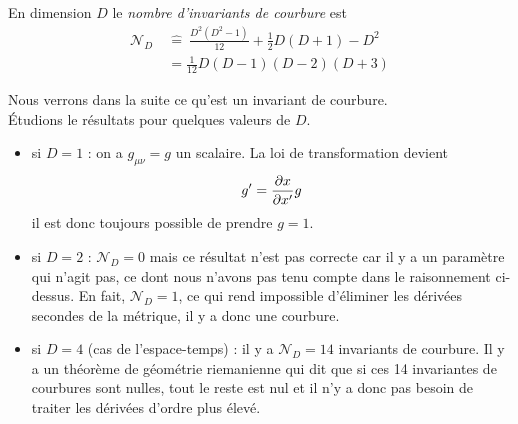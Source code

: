 \documentclass[a4paper,11pt]{report}
\begin{document}
            \begin{defn}
                En dimension $D$ le \textit{nombre d'invariants de courbure} est 
                \begin{align}
                    \mathscr{N}_D ~&\hat{=}~  \frac{D^2(D^2-1)}{12}+\frac{1}{2}D(D+1)-D^2\\
                &= \frac{1}{12}D(D-1)(D-2)(D+3)
                \end{align}
            \end{defn}
            Nous verrons dans la suite ce qu'est un invariant de courbure.\\
            Étudions le résultats pour quelques valeurs de $D$.
            \begin{itemize}[label = \textbullet]
                \item si $D=1$ : on a $g_{\mu\nu} = g$ un scalaire. La loi de transformation devient
                \begin{equation}
                    g' = \frac{\partial x}{\partial x'} g
                \end{equation}
                il est donc toujours possible de prendre $g=1$.
                \item si $D = 2$ : $\mathscr{N}_D = 0$ mais ce résultat n'est pas correcte car il y a un paramètre qui n'agit pas, ce dont nous n'avons pas tenu compte dans le raisonnement ci-dessus. En fait, $\mathscr{N}_D = 1$, ce qui rend impossible d'éliminer les dérivées secondes de la métrique, il y a donc une courbure.
                \item si $D=4$ (cas de l'espace-temps) : il y a $\mathscr{N}_D = 14$ invariants de courbure. Il y a un théorème de géométrie riemanienne qui dit que si ces 14 invariantes de courbures sont nulles, tout le reste est nul et il n'y a donc pas besoin de traiter les dérivées d'ordre plus élevé.
            \end{itemize}
            
\end{document}
